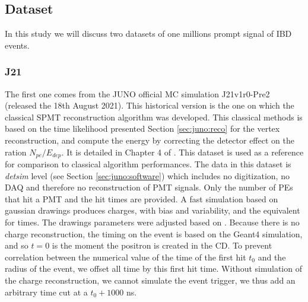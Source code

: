 \documentclass[../main.tex]{subfiles}
\begin{document}
\subsection{Dataset}


In this study we will discuss two datasets of one millions prompt signal of IBD events.

\subsubsection{J21}

The first one comes from the JUNO official MC simulation J21v1r0-Pre2 (released the 18th August 2021). This historical version is the one on which the classical SPMT reconstruction algorithm was developed. This classical methods is based on the time likelihood presented Section \ref{sec:juno:reco} for the vertex reconstruction, and compute the energy by correcting the detector effect on the ration $N_{pe}/E_{dep}$. It is detailed in Chapter 4 of \cite{lebrin_towards_2022}.
This dataset is used as a reference for comparison to classical algorithm performances.
The data in this dataset is \textit{detsim} level (see Section \ref{sec:juno:software})  which includes no digitization, no DAQ  and therefore no reconstruction of PMT signals. Only the number of PEs that hit a PMT and the hit times are provided. A fast simulation based on gaussian drawings produces charges, with bias and variability, and the equivalent for times. The drawings parameters were adjusted based on  \cite{cao_mass_2021, abusleme_mass_2022}.
Because there is no charge reconstruction, the timing on the event is based on the Geant4 simulation, and so $t=0$ is the moment the positron is created in the CD. To prevent correlation between the numerical value of the time of the first hit $t_0$ and the radius of the event, we offset all time by this first hit time. Without simulation of the charge reconstruction, we cannot simulate the event trigger, we thus add an arbitrary time cut at a $t_0 + 1000$ ns.
\end{document}
